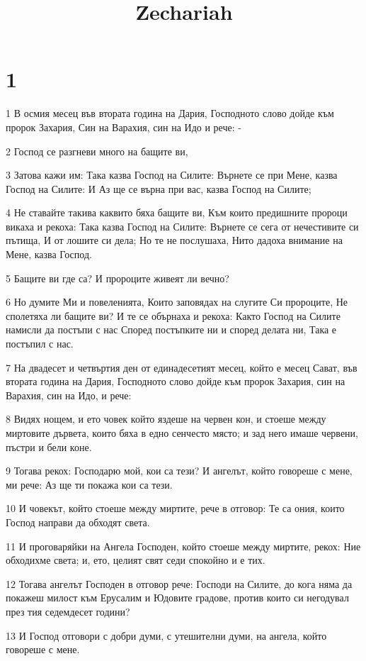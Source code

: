 

\title{Zechariah}


\chapter{1}

\par 1 В осмия месец във втората година на Дария, Господното слово дойде към пророк Захария, Син на Варахия, син на Идо и рече: -
\par 2 Господ се разгневи много на бащите ви,
\par 3 Затова кажи им: Така казва Господ на Силите: Върнете се при Мене, казва Господ на Силите: И Аз ще се върна при вас, казва Господ на Силите;
\par 4 Не ставайте такива каквито бяха бащите ви, Към които предишните пророци викаха и рекоха: Така казва Господ на Силите: Върнете се сега от нечестивите си пътища, И от лошите си дела; Но те не послушаха, Нито дадоха внимание на Мене, казва Господ.
\par 5 Бащите ви где са? И пророците живеят ли вечно?
\par 6 Но думите Ми и повеленията, Които заповядах на слугите Си пророците, Не сполетяха ли бащите ви? И те се обърнаха и рекоха: Както Господ на Силите намисли да постъпи с нас Според постъпките ни и според делата ни, Така е постъпил с нас.
\par 7 На двадесет и четвъртия ден от единадесетият месец, който е месец Сават, във втората година на Дария, Господното слово дойде към пророк Захария, син на Варахия, син на Идо, и рече:
\par 8 Видях нощем, и ето човек който яздеше на червен кон, и стоеше между миртовите дървета, които бяха в едно сенчесто място; и зад него имаше червени, пъстри и бели коне.
\par 9 Тогава рекох: Господарю мой, кои са тези? И ангелът, който говореше с мене, ми рече: Аз ще ти покажа кои са тези.
\par 10 И човекът, който стоеше между миртите, рече в отговор: Те са ония, които Господ направи да обходят света.
\par 11 И проговаряйки на Ангела Господен, който стоеше между миртите, рекох: Ние обходихме света; и, ето, целият свят седи спокойно и е тих.
\par 12 Тогава ангелът Господен в отговор рече: Господи на Силите, до кога няма да покажеш милост към Ерусалим и Юдовите градове, против които си негодувал през тия седемдесет години?
\par 13 И Господ отговори с добри думи, с утешителни думи, на ангела, който говореше с мене.
